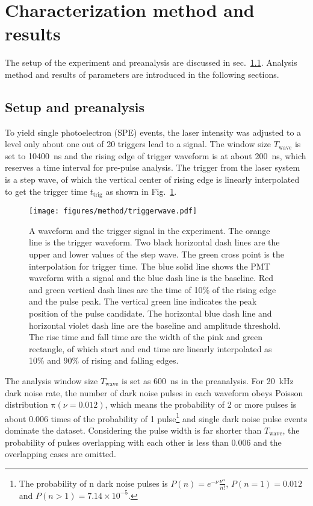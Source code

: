 \section{Characterization method and results}
\label{Method}
The setup of the experiment and preanalysis are discussed in sec.~\ref{sec:laserstage}. Analysis method and results of parameters are introduced in the following sections.
\subsection{Setup and preanalysis}
\label{sec:laserstage}

To yield single photoelectron (SPE) events, the laser intensity was adjusted to a level only about one out of 20 triggers lead to a signal. The window size $T_{\mathrm{wave}}$ is set to \SI{10400}{ns} and the rising edge of trigger waveform is at about \SI{200}{ns}, which reserves a time interval for pre-pulse analysis. The trigger from the laser system is a step wave, of which the vertical center of rising edge is linearly interpolated to get the trigger time $t_{\mathrm{trig}}$ as shown in Fig.~\ref{fig:triggertime}.
\begin{figure}[!htbp]
    \centering
    \texttt{[image: figures/method/triggerwave.pdf]}
    \caption{A waveform and the trigger signal in the experiment. The orange line is the trigger waveform. Two black horizontal dash lines are the upper and lower values of the step wave. The green cross point is the interpolation for trigger time. The blue solid line shows the PMT waveform with a signal and the blue dash line is the baseline. Red and green vertical dash lines are the time of 10\% of the rising edge and the pulse peak. The vertical green line indicates the peak position of the pulse candidate. The horizontal blue dash line and horizontal violet dash line are the baseline and amplitude threshold. The rise time and fall time are the width of the pink and green rectangle, of which start and end time are linearly interpolated as 10\% and 90\% of rising and falling edges.}
    \label{fig:triggertime}
\end{figure}

The analysis window size $T_{\mathrm{wave}}$ is set as \SI{600}{ns} in the preanalysis. For \SI{20}{kHz} dark noise rate, the number of dark noise pulses in each waveform obeys Poisson distribution $\mathrm{\pi}(\nu=0.012)$, which means the probability of 2 or more pulses is about 0.006 times of the probability of 1 pulse\footnote{The probability of n dark noise pulses is $P(n)=e^{-\nu}\frac{\nu^n}{n!}$, $P(n=1)=0.012$ and $P(n>1)=7.14\times10^{-5}$.} and single dark noise pulse events dominate the dataset. Considering the pulse width is far shorter than $T_{\mathrm{wave}}$, the probability of pulses overlapping with each other is less than 0.006 and the overlapping cases are omitted.

